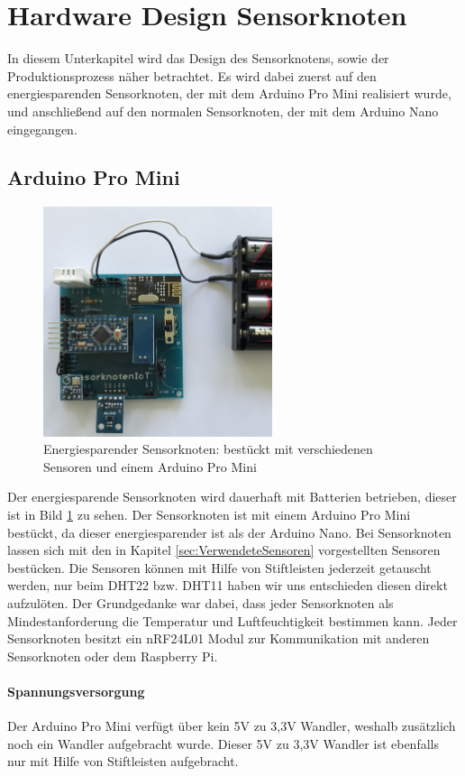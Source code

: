 \section{Hardware Design Sensorknoten}
\label{sec:HardwareDesign}
In diesem Unterkapitel wird das Design des Sensorknotens, sowie der Produktionsprozess näher betrachtet. Es wird dabei zuerst auf den energiesparenden Sensorknoten, der mit dem Arduino Pro Mini realisiert wurde, und anschließend auf den normalen Sensorknoten, der mit dem Arduino Nano eingegangen.
\subsection{Arduino Pro Mini}
\begin{figure}
	\centering
	\includegraphics[width=0.6\textwidth]{bilder/mini_cutted.jpg}
	\caption[Energiesparender Sensorknoten]{Energiesparender Sensorknoten: bestückt mit verschiedenen Sensoren und einem Arduino Pro Mini}
	\label{img:ArduinoProMini}
\end{figure}
Der energiesparende Sensorknoten wird dauerhaft mit Batterien betrieben, dieser ist in Bild \ref{img:ArduinoProMini} zu sehen. Der Sensorknoten ist mit einem Arduino Pro Mini bestückt, da dieser energiesparender ist als der Arduino Nano. Bei Sensorknoten lassen sich mit den in Kapitel \ref{sec:VerwendeteSensoren} vorgestellten Sensoren bestücken. Die Sensoren können mit Hilfe von Stiftleisten jederzeit getauscht werden, nur beim DHT22 bzw. DHT11 haben wir uns entschieden diesen direkt aufzulöten. Der Grundgedanke war dabei, dass jeder Sensorknoten als Mindestanforderung die Temperatur und Luftfeuchtigkeit bestimmen kann. Jeder Sensorknoten besitzt ein nRF24L01 Modul zur Kommunikation mit anderen Sensorknoten oder dem Raspberry Pi.
\paragraph{Spannungsversorgung} Der Arduino Pro Mini verfügt über kein 5V zu 3,3V Wandler, weshalb zusätzlich noch ein Wandler aufgebracht wurde. Dieser 5V zu 3,3V Wandler ist ebenfalls nur mit Hilfe von Stiftleisten aufgebracht. 

